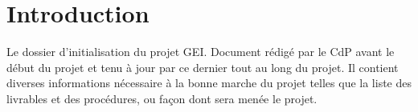 \section{Introduction}

Le dossier d'initialisation du projet GEI. Document rédigé par le CdP avant le 
début du projet et tenu à jour par ce dernier tout au long du projet. Il
contient diverses informations nécessaire à la bonne marche du projet telles que
la liste des livrables et des procédures, ou façon dont sera menée le projet.
